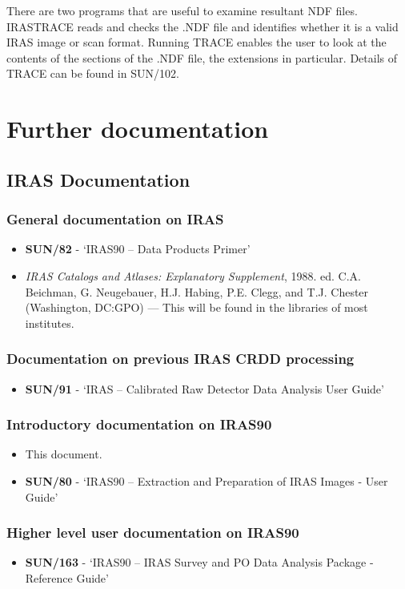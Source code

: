 \documentclass[twoside,11pt]{article}
\newcommand{\xref}[3]{#1}
\newcommand{\xlabel}[1]{}
\begin{document}
There are two programs that are useful to examine resultant NDF files.
IRASTRACE reads and checks the .NDF file and identifies whether it is a valid
IRAS image or scan format. Running TRACE enables  the user to look at the
contents of the sections of the .NDF file, the extensions in particular. Details
of TRACE can be found in \xref{SUN/102}{sun102}{}.

\section{Further documentation
\xlabel{further_documentation}\label{a:docs}}

\subsection{IRAS Documentation}
\subsubsection {General documentation on IRAS}
\begin{itemize}
\item {\bf \xref{SUN/82}{sun82}{}} - `IRAS90 -- Data Products Primer' 
\item {\em IRAS Catalogs and Atlases: Explanatory Supplement}, 1988. ed. C.A. 
Beichman, G. Neugebauer, H.J. Habing, P.E. Clegg, and T.J. Chester (Washington,
DC:GPO) --- This will be found in the libraries of most institutes.
\end{itemize}
\subsubsection {Documentation on previous IRAS CRDD processing}
\begin{itemize}
\item {\bf \xref{SUN/91}{sun91}{}} - `IRAS -- Calibrated Raw Detector Data
Analysis User Guide'
\end{itemize}
\subsubsection {Introductory documentation on IRAS90}
\begin{itemize}
\item This document.
\item {\bf \xref{SUN/80}{sun80}{}} - `IRAS90 -- Extraction and Preparation 
of IRAS Images - User Guide'
\end{itemize}
\subsubsection {Higher level user documentation on IRAS90}
\begin{itemize}
\item {\bf \xref{SUN/163}{sun163}{}} - `IRAS90 -- IRAS Survey and PO Data
Analysis Package - Reference Guide'
\end{itemize}
\end{document}
